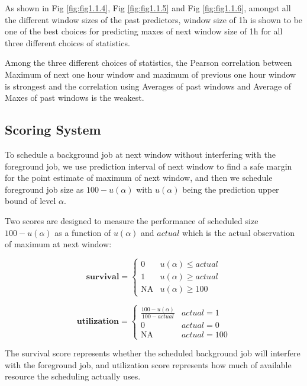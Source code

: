 \documentclass{article}
\begin{document}
\begin{flushleft}
As shown in Fig \ref{fig:fig1.1.4}, Fig \ref{fig:fig1.1.5} and Fig \ref{fig:fig1.1.6}, amongst all the different window sizes of the past predictors, window size of 1h is shown to be one of the best choices for predicting maxes of next window size of 1h for all three different choices of statistics.

Among the three different choices of statistics, the Pearson correlation between Maximum of next one hour window and maximum of previous one hour window is strongest and the correlation using Averages of past windows and Average of Maxes of past windows is the weakest.
\end{flushleft}

\subsection{Scoring System}

\begin{flushleft}
To schedule a background job at next window without interfering with the foreground job, we use prediction interval of next window to find a safe margin for the point estimate of maximum of next window, and then we schedule foreground job size as $100 - u(\alpha)$ with $u(\alpha)$ being the prediction upper bound of level $\alpha$.

Two scores are designed to measure the performance of scheduled size $100 - u(\alpha)$ as a function of $u(\alpha)$ and $actual$ which is the actual observation of maximum at next window:

\begin{equation}
    \mathbf{survival} =
    \begin{cases}
    0 & u(\alpha) \leq actual \\
    1 & u(\alpha) \geq actual \\
    \text{NA} & u(\alpha) \geq 100
    \end{cases}
\end{equation}

\begin{equation}
    \mathbf{utilization} =
   \begin{cases} 
    \frac{100 - u(\alpha)}{100 - actual} & actual = 1  \\
    0 & actual = 0 \\
    \text{NA} & actual = 100
   \end{cases}
\end{equation}

The survival score represents whether the scheduled background job will interfere with the foreground job, and utilization score represents how much of available resource the scheduling actually uses.
\end{flushleft}
\end{document}

